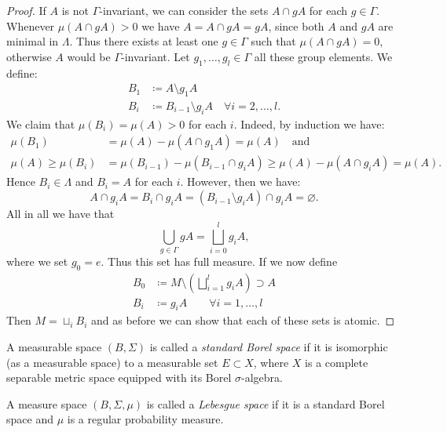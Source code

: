 \begin{proof}
  If \(A\) is not \(\Gamma\)-invariant, we can consider the sets \(A \cap gA\) for each \(g \in \Gamma\). Whenever \(\mu(A \cap gA) > 0\) we have \(A = A \cap gA = gA\), since both \(A\) and \(gA\) are minimal in \(\Lambda\). Thus there exists at least one \(g \in \Gamma\) such that \(\mu(A \cap gA) = 0\), otherwise \(A\) would be \(\Gamma\)-invariant. Let \(g_1, \dots, g_l \in \Gamma\) all these group elements. We define:
  \begin{align*}
    B_1 & \coloneqq A \setminus g_1A\\
    B_i & \coloneqq B_{i-1} \setminus g_i A \quad \forall i = 2, \dots, l.
  \end{align*}
  We claim that \(\mu(B_i) = \mu(A) >0\) for each \(i\). Indeed, by induction we have:
  \begin{align*}
    \mu(B_1) & = \mu(A) - \mu(A \cap g_1A) = \mu(A) \quad \text{and}\\
    \mu(A) \geq \mu(B_i) & = \mu(B_{i-1}) - \mu(B_{i-1} \cap g_iA) \geq \mu(A) - \mu(A \cap g_i A) = \mu(A).
  \end{align*}
  Hence \(B_i \in \Lambda\) and \(B_i = A\) for each \(i\). However, then we have:
  \[
    A \cap g_iA = B_i \cap g_iA = (B_{i-1} \setminus g_iA) \cap g_iA = \varnothing.
  \]
  All in all we have that
  \[
    \bigcup_{g \in \Gamma} gA = \bigsqcup_{i=0}^l g_i A,
  \]
  where we set \(g_0 = e\). Thus this set has full measure. If we now define
  \begin{align*}
    B_0 & \coloneqq M \setminus \left (\bigsqcup_{i=1}^l g_iA \right) \supset A\\
    B_i & \coloneqq g_iA \qquad \forall i = 1, \dots, l
  \end{align*}
  Then \(M = \sqcup_i B_i\) and as before we can show that each of these sets is atomic.
\end{proof}

\begin{defin}
  A measurable space \((B, \Sigma)\) is called a \emph{standard Borel space} if it is isomorphic (as a measurable space) to a measurable set \(E \subset X\), where \(X\) is a complete separable metric space equipped with its Borel \(\sigma\)-algebra.

  A measure space \((B, \Sigma, \mu)\) is called a \emph{Lebesgue space} if it is a standard Borel space and \(\mu\) is a regular probability measure.

\end{defin}

